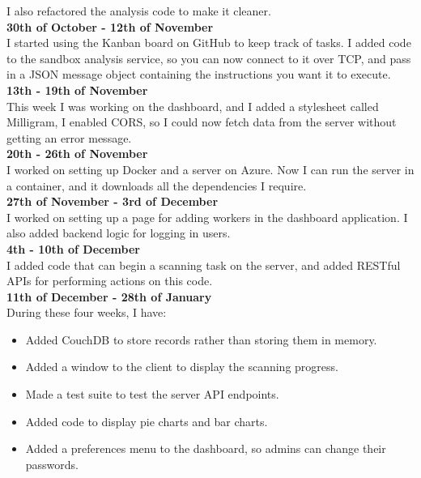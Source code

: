 I also refactored the analysis code to make it cleaner. \\

\textbf{30th of October - 12th of November} \\
I started using the Kanban board on GitHub to keep track of tasks.
I added code to the sandbox analysis service, so you can now connect to it over TCP,
and pass in a JSON message object containing the instructions you want it to execute. \\

\textbf{13th - 19th of November} \\
This week I was working on the dashboard, and I added a stylesheet called Milligram,
I enabled CORS, so I could now fetch data from the server without getting an error message. \\

\textbf{20th - 26th of November} \\
I worked on setting up Docker and a server on Azure.
Now I can run the server in a container, and it downloads all the dependencies I require. \\

\textbf{27th of November - 3rd of December} \\
I worked on setting up a page for adding workers in the dashboard application.
I also added backend logic for logging in users. \\

\textbf{4th - 10th of December} \\
I added code that can begin a scanning task on the server,
and added RESTful APIs for performing actions on this code. \\

\textbf{11th of December - 28th of January} \\
During these four weeks, I have:
\begin{itemize}
    \item Added CouchDB to store records rather than storing them in memory.
    \item Added a window to the client to display the scanning progress.
    \item Made a test suite to test the server API endpoints.
    \item Added code to display pie charts and bar charts.
    \item Added a preferences menu to the dashboard,
    so admins can change their passwords.
\end{itemize}

